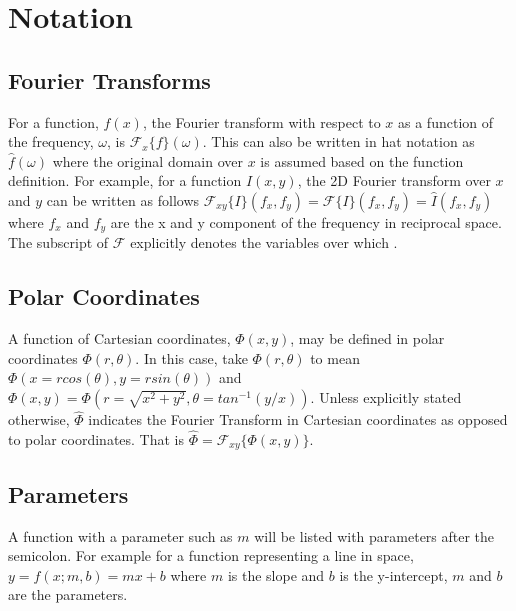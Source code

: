 \documentclass{article}
\begin{document}
\section{Notation}
\subsection{Fourier Transforms}
For a function, $f(x)$, the Fourier transform with respect to $ x $ as a function of the frequency, $ \omega $, is $ \mathcal{F}_x\{f\}(\omega) $. This can also be written in hat notation as $ \hat{f}(\omega) $ where the original domain over $ x $ is assumed based on the function definition. For example, for a function $ I(x,y) $, the 2D Fourier transform over $ x $ and $ y $ can be written as follows $ \mathcal{F}_{xy}\{I\}(f_x,f_y) = \mathcal{F}\{I\}(f_x,f_y) = \widehat{I}(f_x,f_y) $ where $ f_x $ and $ f_y $ are the x and y component of the frequency in reciprocal space. The subscript of $ \mathcal{F} $ explicitly denotes the variables over which .

\subsection{Polar Coordinates}
A function of Cartesian coordinates, $ \Phi(x,y) $, may be defined in polar coordinates $ \Phi(r,\theta) $. In this case, take $ \Phi(r,\theta) $ to mean $\Phi(x = r cos(\theta),y = r sin(\theta) ) $ and $ \Phi(x,y) = \Phi(r = \sqrt{x^2+y^2},\theta = tan^{-1}(y/x)) $. Unless explicitly stated otherwise, $ \widehat{\Phi} $ indicates the Fourier Transform in Cartesian coordinates as opposed to polar coordinates. That is $ \widehat{\Phi} = \mathcal{F}_{xy}\{\Phi(x,y)\} $.

\subsection{Parameters}
A function with a parameter such as $ m $ will be listed with parameters after the semicolon. For example for a function representing a line in space, $ y = f(x; m,b) = mx+b $ where $ m $ is the slope and $ b $ is the y-intercept, $ m $ and $ b $ are the parameters.
\end{document}
